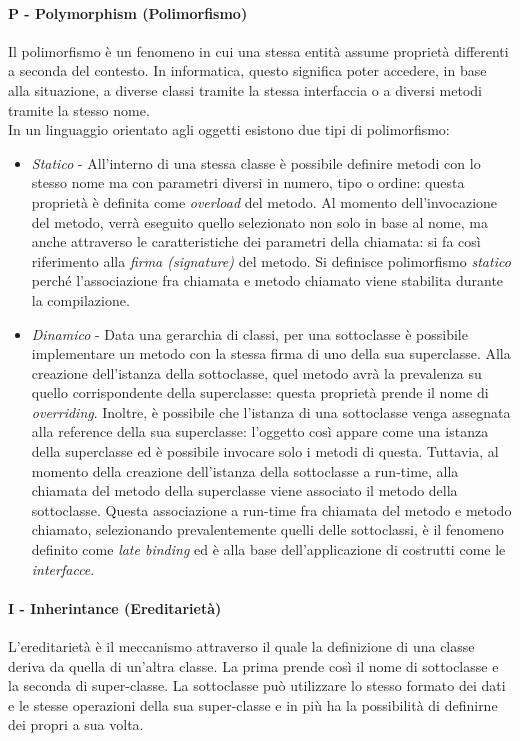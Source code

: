\documentclass{article}
\begin{document}
            \paragraph{P - Polymorphism (Polimorfismo)} Il polimorfismo è un fenomeno in cui una stessa entità assume proprietà differenti a seconda del contesto. In informatica, questo significa poter accedere, in base alla situazione, a diverse classi tramite la stessa interfaccia o a diversi metodi tramite la stesso nome.\\
                In un linguaggio orientato agli oggetti esistono due tipi di polimorfismo:
                \begin{itemize}
                    \item \textit{Statico} - All'interno di una stessa classe è possibile definire metodi con lo stesso nome ma con parametri diversi in numero, tipo o ordine: questa proprietà è definita come \textit{overload} del metodo. Al momento dell'invocazione del metodo, verrà eseguito quello selezionato non solo in base al nome, ma anche attraverso le caratteristiche dei parametri della chiamata: si fa così riferimento alla \textit{firma (signature)} del metodo. Si definisce polimorfismo \textit{statico} perché l'associazione fra chiamata e metodo chiamato viene stabilita durante la compilazione.
                    \item \textit{Dinamico} - Data una gerarchia di classi, per una sottoclasse è possibile implementare un metodo con la stessa firma di uno della sua superclasse. Alla creazione dell'istanza della sottoclasse, quel metodo avrà la prevalenza su quello corrispondente della superclasse: questa proprietà prende il nome di \textit{overriding}. Inoltre, è possibile che l'istanza di una sottoclasse venga assegnata alla reference della sua superclasse: l'oggetto così appare come una istanza della superclasse ed è possibile invocare solo i metodi di questa. Tuttavia, al momento della creazione dell'istanza della sottoclasse a run-time, alla chiamata del metodo della superclasse viene associato il metodo della sottoclasse. Questa associazione a run-time fra chiamata del metodo e metodo chiamato, selezionando prevalentemente quelli delle sottoclassi, è il fenomeno definito come \textit{late binding} ed è alla base dell'applicazione di costrutti come le \textit{interfacce}.
                \end{itemize}
            
                \paragraph{I - Inherintance (Ereditarietà)} L'ereditarietà è il meccanismo attraverso il quale la definizione di una classe deriva da quella di un'altra classe. La prima prende così il nome di sottoclasse e la seconda di super-classe. La sottoclasse può utilizzare lo stesso formato dei dati e le stesse operazioni della sua super-classe e in più ha la possibilità di definirne dei propri a sua volta.
            
\end{document}

